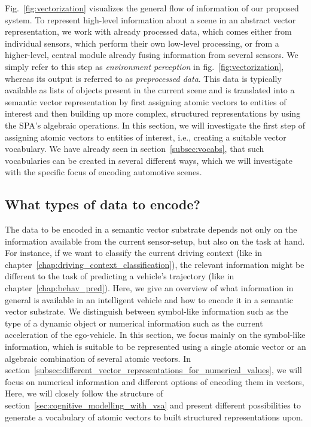 Fig.~\ref{fig:vectorization} visualizes the general flow of information of our proposed system.
To represent high-level information about a scene in an abstract vector representation, we work with already processed data, which comes either from individual sensors, which perform their own low-level processing, or from a higher-level, central module already fusing information from several sensors.
We simply refer to this step as \emph{environment perception} in fig.~\ref{fig:vectorization}, whereas its output is referred to as \emph{preprocessed data}.
This data is typically available as lists of objects present in the current scene and is translated into a semantic vector representation by first assigning atomic vectors to entities of interest and then building up more complex, structured representations by using the \ac{SPA}'s algebraic operations.
In this section, we will investigate the first step of assigning atomic vectors to entities of interest, i.e., creating a suitable vector vocabulary.
We have already seen in section~\ref{subsec:vocabs}, that such vocabularies can be created in several different ways, which we will investigate with the specific focus of encoding automotive scenes.

\subsection{What types of data to encode?}%
\label{subsec:what_types_of_data_to_encode_}

The data to be encoded in a semantic vector substrate depends not only on the information available from the current sensor-setup, but also on the task at hand.
For instance, if we want to classify the current driving context (like in chapter~\ref{chap:driving_context_classification}), the relevant information might be different to the task of predicting a vehicle's trajectory (like in chapter~\ref{chap:behav_pred}).
Here, we give an overview of what information in general is available in an intelligent vehicle and how to encode it in a semantic vector substrate.
We distinguish between symbol-like information such as the type of a dynamic object or numerical information such as the current acceleration of the ego-vehicle.
In this section, we focus mainly on the symbol-like information, which is suitable to be represented using a single atomic vector or an algebraic combination of several atomic vectors.
In section~\ref{subsec:different_vector_representations_for_numerical_values}, we will focus on numerical information and different options of encoding them in vectors,
Here, we will closely follow the structure of section~\ref{sec:cognitive_modelling_with_vsa} and present different possibilities to generate a vocabulary of atomic vectors to built structured representations upon.

